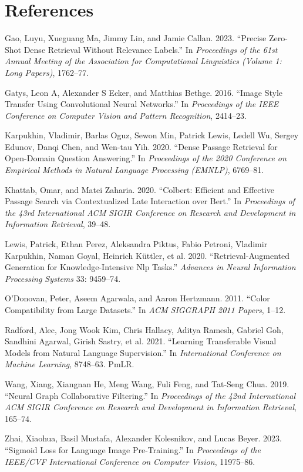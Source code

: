 \documentclass[
  11pt,
]{article}
\newlength{\cslhangindent}
\newenvironment{CSLReferences}[2] %
 {\begin{list}{}{%
  \setlength{\itemindent}{0pt}
  \setlength{\leftmargin}{0pt}
  \setlength{\parsep}{0pt}
  \ifodd #1
   \setlength{\leftmargin}{\cslhangindent}
   \setlength{\itemindent}{-1\cslhangindent}
  \fi
  \setlength{\itemsep}{#2\baselineskip}}}
 {\end{list}}
\begin{document}
\section{References}\label{references}

\label{refs}
\begin{CSLReferences}{1}{0}
Gao, Luyu, Xueguang Ma, Jimmy Lin, and Jamie Callan. 2023. {``Precise
Zero-Shot Dense Retrieval Without Relevance Labels.''} In
\emph{Proceedings of the 61st Annual Meeting of the Association for
Computational Linguistics (Volume 1: Long Papers)}, 1762--77.

Gatys, Leon A, Alexander S Ecker, and Matthias Bethge. 2016. {``Image
Style Transfer Using Convolutional Neural Networks.''} In
\emph{Proceedings of the IEEE Conference on Computer Vision and Pattern
Recognition}, 2414--23.

Karpukhin, Vladimir, Barlas Oguz, Sewon Min, Patrick Lewis, Ledell Wu,
Sergey Edunov, Danqi Chen, and Wen-tau Yih. 2020. {``Dense Passage
Retrieval for Open-Domain Question Answering.''} In \emph{Proceedings of
the 2020 Conference on Empirical Methods in Natural Language Processing
(EMNLP)}, 6769--81.

Khattab, Omar, and Matei Zaharia. 2020. {``Colbert: Efficient and
Effective Passage Search via Contextualized Late Interaction over
Bert.''} In \emph{Proceedings of the 43rd International ACM SIGIR
Conference on Research and Development in Information Retrieval},
39--48.

Lewis, Patrick, Ethan Perez, Aleksandra Piktus, Fabio Petroni, Vladimir
Karpukhin, Naman Goyal, Heinrich Küttler, et al. 2020.
{``Retrieval-Augmented Generation for Knowledge-Intensive Nlp Tasks.''}
\emph{Advances in Neural Information Processing Systems} 33: 9459--74.

O'Donovan, Peter, Aseem Agarwala, and Aaron Hertzmann. 2011. {``Color
Compatibility from Large Datasets.''} In \emph{ACM SIGGRAPH 2011
Papers}, 1--12.

Radford, Alec, Jong Wook Kim, Chris Hallacy, Aditya Ramesh, Gabriel Goh,
Sandhini Agarwal, Girish Sastry, et al. 2021. {``Learning Transferable
Visual Models from Natural Language Supervision.''} In
\emph{International Conference on Machine Learning}, 8748--63. PmLR.

Wang, Xiang, Xiangnan He, Meng Wang, Fuli Feng, and Tat-Seng Chua. 2019.
{``Neural Graph Collaborative Filtering.''} In \emph{Proceedings of the
42nd International ACM SIGIR Conference on Research and Development in
Information Retrieval}, 165--74.

Zhai, Xiaohua, Basil Mustafa, Alexander Kolesnikov, and Lucas Beyer.
2023. {``Sigmoid Loss for Language Image Pre-Training.''} In
\emph{Proceedings of the IEEE/CVF International Conference on Computer
Vision}, 11975--86.

\end{CSLReferences}
\end{document}
